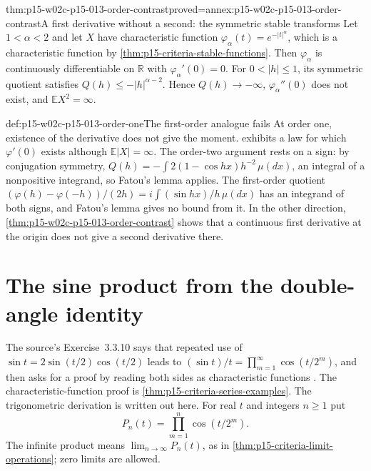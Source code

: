 \begin{hbtheorem}{thm:p15-w02c-p15-013-order-contrast}{proved=annex:p15-w02c-p15-013-order-contrast}{A first derivative without a second: the symmetric stable transforms}
Let \(1<\alpha<2\) and let \(X\) have characteristic function
\(\varphi_\alpha(t)=e^{-|t|^\alpha}\), which is a characteristic function by
\cref{thm:p15-criteria-stable-functions}. Then \(\varphi_\alpha\) is
continuously differentiable on \(\mathbb R\) with \(\varphi_\alpha'(0)=0\).
For \(0<|h|\leq1\), its symmetric quotient satisfies
\(Q(h)\leq-|h|^{\alpha-2}\). Hence \(Q(h)\to-\infty\), \(\varphi_\alpha''(0)\)
does not exist, and \(\mathbb EX^2=\infty\).
\end{hbtheorem}

\begin{hbwarning}{def:p15-w02c-p15-013-order-one}{The first-order analogue fails}
At order one, existence of the derivative does not give the moment.
 exhibits a law for which
\(\varphi'(0)\) exists although \(\mathbb E|X|=\infty\). The order-two
argument rests on a sign: by conjugation symmetry,
\(Q(h)=-\int 2(1-\cos hx)h^{-2}\,\mu(dx)\), an integral of a nonpositive
integrand, so Fatou's lemma applies. The first-order quotient
\((\varphi(h)-\varphi(-h))/(2h)=i\int(\sin hx)/h\,\mu(dx)\) has an integrand
of both signs, and Fatou's lemma gives no bound from it. In the other
direction, \cref{thm:p15-w02c-p15-013-order-contrast} shows that a
continuous first derivative at the origin does not give a second derivative
there.
\end{hbwarning}

\section{The sine product from the double-angle identity}
\label{sec:p15-w02c-p15-013-sine-product}

The source's Exercise~3.3.10 says that repeated use of
\(\sin t=2\sin(t/2)\cos(t/2)\) leads to
\((\sin t)/t=\prod_{m=1}^\infty\cos(t/2^m)\), and then asks for a proof by
reading both sides as characteristic functions
\cite[p.~133, Exercise~3.3.10]{DurrettPTEAuthor2019}. The
characteristic-function proof is
\cref{thm:p15-criteria-series-examples}. The trigonometric derivation is
written out here. For real \(t\) and integers \(n\geq1\) put
\[
 P_n(t)=\prod_{m=1}^{n}\cos(t/2^m).
\]
The infinite product means \(\lim_{n\to\infty}P_n(t)\), as in
\cref{thm:p15-criteria-limit-operations}; zero limits are allowed.

